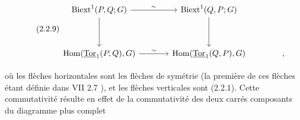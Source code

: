 \begin{equation}\tag{2.2.9}
\begin{tikzcd}[column sep=large, row sep=huge]
\mathrm{Biext}^1(P,Q;G) \arrow[r, "\sim"] \arrow[d] & \mathrm{Biext}^1(Q,P;G) \arrow[d] \\
\mathrm{Hom}(\underline{\mathrm{Tor}}_1(P,Q),G) \arrow[r, "\sim"] & \mathrm{Hom}(\underline{\mathrm{Tor}}_1(Q,P),G) & ,
\end{tikzcd}
\end{equation}


 où les flèches horizontales sont les flèches de symétrie (la première de ces flèches étant définie dans VII 2.7 ), et les flèches verticales sont (2.2.1). Cette commutativité résulte en effet de la commutativité des deux carrés composants du diagramme plus complet

